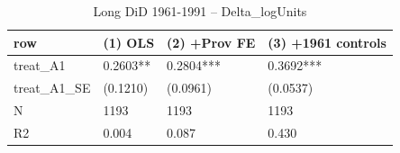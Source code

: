 \begin{table}

\caption{Long DiD 1961-1991 -- Delta_logUnits}
\centering
\begin{tabular}[t]{llll}
\toprule
row & (1) OLS & (2) +Prov FE & (3) +1961 controls\\
\midrule
treat\_A1 & 0.2603** & 0.2804*** & 0.3692***\\
treat\_A1\_SE & (0.1210) & (0.0961) & (0.0537)\\
N & 1193 & 1193 & 1193\\
R2 & 0.004 & 0.087 & 0.430\\
\bottomrule
\end{tabular}
\end{table}
